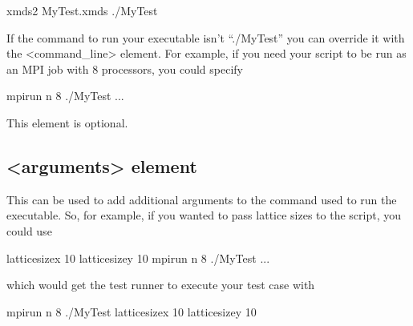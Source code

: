 \documentclass[letterpaper,10pt,english]{sphinxmanual}
\begin{document}
\begin{sphinxVerbatim}[commandchars=\\\{\}]
xmds2 MyTest.xmds
./MyTest
\end{sphinxVerbatim}

\sphinxAtStartPar
If the command to run your executable isn’t “./MyTest” you can override it with the \textless{}command\_line\textgreater{} element. For example, if you need your script to be run as an MPI job with 8 processors, you could specify

\begin{sphinxVerbatim}[commandchars=\\\{\}]
    mpirun \PYGZhy{}n 8 ./MyTest 
   ...
\end{sphinxVerbatim}

\sphinxAtStartPar
This element is optional.


\subsection{\textless{}arguments\textgreater{} element}
\label{\detokenize{developer:arguments-element}}
\sphinxAtStartPar
This can be used to add additional arguments to the command used to run the executable. So, for example, if you wanted to pass lattice sizes to the script, you could use

\begin{sphinxVerbatim}[commandchars=\\\{\}]
   \PYGZhy{}\PYGZhy{}latticesize\PYGZus{}x 10 \PYGZhy{}\PYGZhy{}latticesize\PYGZus{}y 10 
   mpirun \PYGZhy{}n 8 ./MyTest 
  ...
\end{sphinxVerbatim}

\sphinxAtStartPar
which would get the test runner to execute your test case with

\begin{sphinxVerbatim}[commandchars=\\\{\}]
mpirun \PYGZhy{}n 8 ./MyTest \PYGZhy{}\PYGZhy{}latticesize\PYGZus{}x 10 \PYGZhy{}\PYGZhy{}latticesize\PYGZus{}y 10
\end{sphinxVerbatim}
\end{document}
